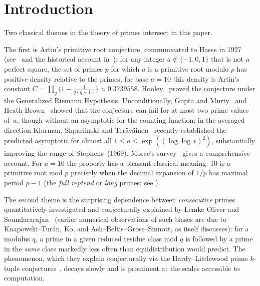 \documentclass[11pt]{amsart}
\theoremstyle{definition}
\begin{document}
\maketitle

\section{Introduction}
\label{sec:intro}

Two classical themes in the theory of primes intersect in this paper.

The first is Artin's primitive root conjecture, communicated to Hasse in 1927
(see~\cite{Artin1965} and the historical account in~\cite{Moree2012}): for any integer
$a \notin \{-1, 0, 1\}$ that is not a perfect square, the set of primes $p$ for
which $a$ is a primitive root modulo $p$ has positive density relative to
the primes; for base
$a = 10$ this density is Artin's constant
$C = \prod_q \bigl(1 - \tfrac{1}{q(q-1)}\bigr) \approx 0.3739558$.
Hooley~\cite{Hooley1967} proved the conjecture under the Generalized Riemann
Hypothesis. Unconditionally, Gupta and Murty~\cite{GuptaMurty1984} and
Heath-Brown~\cite{HeathBrown1986} showed that the conjecture can fail for at
most two prime values of~$a$, though without an asymptotic for the counting
function; in the averaged direction Klurman, Shparlinski and
Ter\"av\"ainen~\cite{KlurmanShparlinskiTeravainen2025} recently established the
predicted asymptotic for almost all $1 \le a \le \exp((\log\log x)^2)$,
substantially improving the range of Stephens~(1969). Moree's
survey~\cite{Moree2012} gives a comprehensive account.
For $a = 10$ the property has a pleasant classical meaning: $10$ is a primitive
root mod $p$ precisely when the decimal expansion of $1/p$ has maximal period
$p - 1$ (the \emph{full reptend} or \emph{long} primes; see
\cite[pp.~166--171]{ConwayGuy1996}).

The second theme is the surprising dependence between \emph{consecutive}
primes quantitatively investigated and conjecturally explained by Lemke Oliver
and Soundararajan~\cite{LOS2016} (earlier numerical observations of such
biases are due to Knapowski--Tur\'an, Ko, and Ash--Beltis--Gross--Sinnott, as
\cite{LOS2016} itself discusses): for a
modulus $q$, a prime in a given reduced residue class mod $q$ is followed by a
prime in the \emph{same} class markedly less often than equidistribution would
predict. The phenomenon, which they explain conjecturally via the
Hardy--Littlewood prime $k$-tuple conjectures~\cite{HardyLittlewood1923}, decays
slowly and is prominent at the scales accessible to computation.
\end{document}
